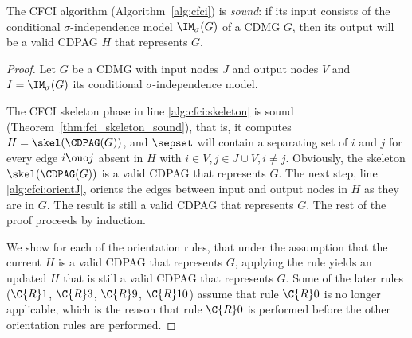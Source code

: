 \begin{Thm}\label{thm:fci_sound}
  The CFCI algorithm (Algorithm~\ref{alg:cfci}) is \emph{sound}: if its input consists of the conditional $\sigma$-independence model $\IM_\sigma(G)$ of a CDMG $G$, then its output will be a valid CDPAG $H$ that represents $G$.
\end{Thm}
\begin{proof}
  Let $G$ be a CDMG with input nodes $J$ and output nodes $V$ and $I = \IM_\sigma(G)$ its conditional $\sigma$-independence model.

  The CFCI skeleton phase in line \ref{alg:cfci:skeleton} is sound (Theorem~\ref{thm:fci_skeleton_sound}),
  that is, it computes $H = \skel(\CDPAG(G))$, and $\sepset$ will contain a separating set of $i$ and $j$ for every edge $i \ouo j$ absent in $H$ with $i \in V, j \in J \cup V, i \ne j$.
  Obviously, the skeleton $\skel(\CDPAG(G))$ is a valid CDPAG that represents $G$.
  The next step, line \ref{alg:cfci:orientJ}, orients the edges between input and output nodes in $H$ as they are in $G$. 
  The result is still a valid CDPAG that represents $G$.
  The rest of the proof proceeds by induction.

  We show for each of the orientation rules, that under the assumption that the current $H$ is a valid CDPAG that represents $G$, applying the rule yields an updated $H$ that is still a valid CDPAG that represents $G$.
  Some of the later rules ($\C{R}1$, $\C{R}3$, $\C{R}9$, $\C{R}10$) assume that rule $\C{R}0$ is no longer applicable, which is the reason that rule $\C{R}0$ is performed before the other orientation rules are performed.


\end{proof}
